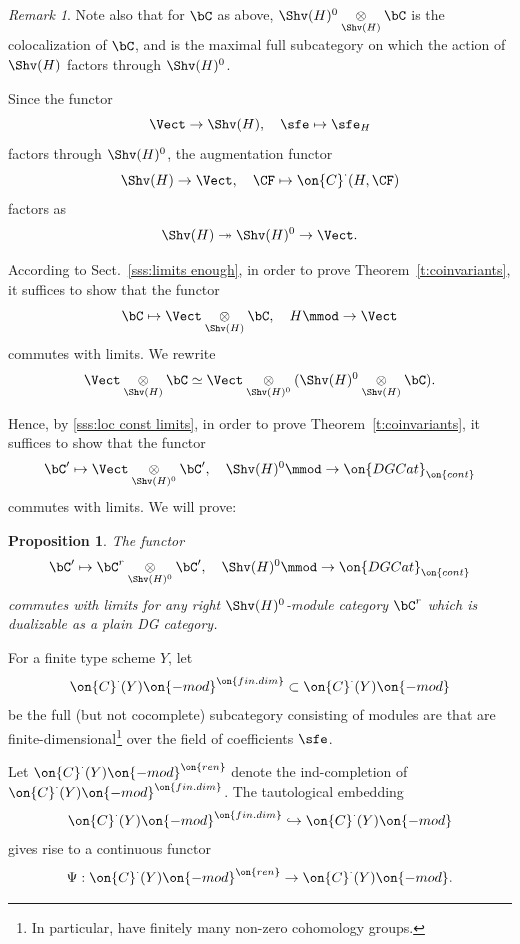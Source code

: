 \documentclass[9pt]{amsart}
\newtheorem{prop}[subsubsection]{Proposition}
\theoremstyle{definition}
\theoremstyle{remark}
\newtheorem{rem}[subsubsection]{Remark}
\newcommand{\thmref}[1]{Theorem~\ref{#1}}
\newcommand{\secref}[1]{Sect.~\ref{#1}}
\numberwithin{equation}{section}
\renewcommand{\mod}{{\on{-mod}}}
\begin{document}
\begin{rem} \label{r:loc const act}
Note also that for $\bC$ as above, $\Shv(H)^0\underset{\Shv(H)}\otimes \bC$ is the colocalization of $\bC$,
and is the maximal full subcategory on which the action of $\Shv(H)$ factors through $\Shv(H)^0$.
\end{rem} 

\sssec{}

Since the functor
$$\Vect\to \Shv(H), \quad \sfe\mapsto \sfe_H$$
factors through $\Shv(H)^0$, the augmentation functor
$$\Shv(H) \to \Vect, \quad \CF\mapsto \on{C}^\cdot(H,\CF)$$
factors as
$$\Shv(H) \twoheadrightarrow \Shv(H)^0\to \Vect.$$

According to  \secref{sss:limits enough}, in order to prove \thmref{t:coinvariants}, it suffices
to show that the functor
$$\bC\mapsto \Vect\underset{\Shv(H)}\otimes \bC, \quad H\mmod\to \Vect$$
commutes with limits. We rewrite
$$\Vect\underset{\Shv(H)}\otimes \bC\simeq \Vect\underset{\Shv(H)^0}\otimes (\Shv(H)^0 \underset{\Shv(H)}\otimes \bC).$$
 
Hence, by \ref{sss:loc const limits}, in order to prove
\thmref{t:coinvariants}, it suffices to show that the functor
$$\bC'\mapsto \Vect\underset{\Shv(H)^0}\otimes \bC', \quad \Shv(H)^0\mmod\to \on{DGCat}_{\on{cont}}$$
commutes with limits. We will prove:

\begin{prop} \label{p:H0 limits}
The functor
$$\bC'\mapsto \bC^r\underset{\Shv(H)^0}\otimes \bC', \quad \Shv(H)^0\mmod\to \on{DGCat}_{\on{cont}}$$
commutes with limits for any right $\Shv(H)^0$-module category $\bC^r$ which is dualizable as a plain DG category.
\end{prop} 


\sssec{}  \label{sss:ren}

For a finite type scheme $Y$, let 
$$\on{C}^\cdot(Y)\mod^{\on{fin.dim}}\subset \on{C}^\cdot(Y)\mod$$
be the full (but not cocomplete) subcategory consisting of modules are that
are finite-dimensional\footnote{In particular, have finitely many non-zero cohomology groups.}
over the field of coefficients $\sfe$.

\medskip

Let $\on{C}^\cdot(Y)\mod^{\on{ren}}$ denote the ind-completion of $\on{C}^\cdot(Y)\mod^{\on{fin.dim}}$.
The tautological embedding
$$\on{C}^\cdot(Y)\mod^{\on{fin.dim}}\hookrightarrow \on{C}^\cdot(Y)\mod$$
gives rise to a continuous functor
$$\Psi:\on{C}^\cdot(Y)\mod^{\on{ren}}\to \on{C}^\cdot(Y)\mod.$$
\end{document}
